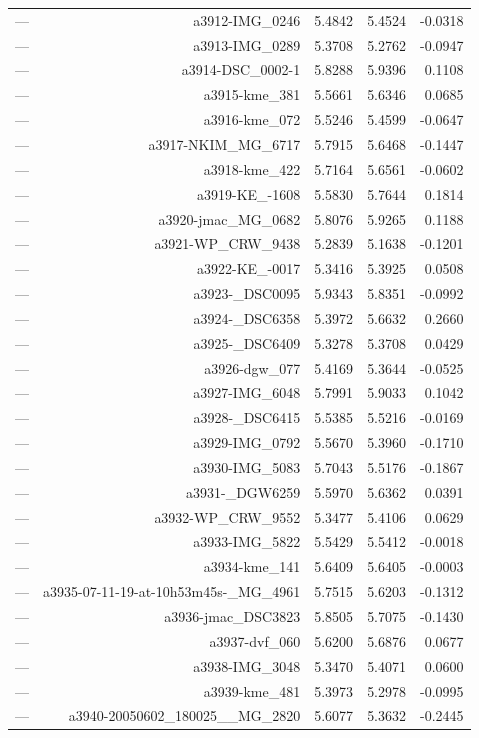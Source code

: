 \begin{table}[htbp]
\begin{tabular}{lrrrr}
— & a3912-IMG_0246 & 5.4842 & 5.4524 & -0.0318 \\
— & a3913-IMG_0289 & 5.3708 & 5.2762 & -0.0947 \\
— & a3914-DSC_0002-1 & 5.8288 & 5.9396 & 0.1108 \\
— & a3915-kme_381 & 5.5661 & 5.6346 & 0.0685 \\
— & a3916-kme_072 & 5.5246 & 5.4599 & -0.0647 \\
— & a3917-NKIM_MG_6717 & 5.7915 & 5.6468 & -0.1447 \\
— & a3918-kme_422 & 5.7164 & 5.6561 & -0.0602 \\
— & a3919-KE_-1608 & 5.5830 & 5.7644 & 0.1814 \\
— & a3920-jmac_MG_0682 & 5.8076 & 5.9265 & 0.1188 \\
— & a3921-WP_CRW_9438 & 5.2839 & 5.1638 & -0.1201 \\
— & a3922-KE_-0017 & 5.3416 & 5.3925 & 0.0508 \\
— & a3923-_DSC0095 & 5.9343 & 5.8351 & -0.0992 \\
— & a3924-_DSC6358 & 5.3972 & 5.6632 & 0.2660 \\
— & a3925-_DSC6409 & 5.3278 & 5.3708 & 0.0429 \\
— & a3926-dgw_077 & 5.4169 & 5.3644 & -0.0525 \\
— & a3927-IMG_6048 & 5.7991 & 5.9033 & 0.1042 \\
— & a3928-_DSC6415 & 5.5385 & 5.5216 & -0.0169 \\
— & a3929-IMG_0792 & 5.5670 & 5.3960 & -0.1710 \\
— & a3930-IMG_5083 & 5.7043 & 5.5176 & -0.1867 \\
— & a3931-_DGW6259 & 5.5970 & 5.6362 & 0.0391 \\
— & a3932-WP_CRW_9552 & 5.3477 & 5.4106 & 0.0629 \\
— & a3933-IMG_5822 & 5.5429 & 5.5412 & -0.0018 \\
— & a3934-kme_141 & 5.6409 & 5.6405 & -0.0003 \\
— & a3935-07-11-19-at-10h53m45s-_MG_4961 & 5.7515 & 5.6203 & -0.1312 \\
— & a3936-jmac_DSC3823 & 5.8505 & 5.7075 & -0.1430 \\
— & a3937-dvf_060 & 5.6200 & 5.6876 & 0.0677 \\
— & a3938-IMG_3048 & 5.3470 & 5.4071 & 0.0600 \\
— & a3939-kme_481 & 5.3973 & 5.2978 & -0.0995 \\
— & a3940-20050602_180025__MG_2820 & 5.6077 & 5.3632 & -0.2445 \\

\end{tabular}
\end{table}
